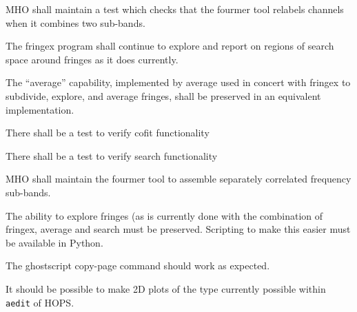 \begin{description}
 \acs{MHO} shall maintain a test which checks that the \acs{fourmer} 
tool relabels channels when it combines two sub-bands.
  
 The \acs{fringex} program shall continue to explore and report
      on regions of search space around fringes as it does currently.

 The ``average'' capability, implemented by \acs{average}
      used in concert with \acs{fringex} to subdivide, explore, and average
      fringes, shall be preserved in an equivalent implementation.
      
 There shall be a test to verify \acs{cofit} functionality
      
 There shall be a test to verify \acs{search} functionality
      
 \acs{MHO} shall maintain the \acs{fourmer} tool
      to assemble separately correlated frequency sub-bands.

 The ability to explore fringes (as is currently done with
    the combination of \acs{fringex}, \acs{average} and search must be
    preserved.  Scripting to make this easier must be available in
    \acs{Python}.

 The ghostscript copy-page command should work as expected.

 It should be possible to make 2D plots of the type
    currently possible within \texttt{\acs{aedit}} of \acs{HOPS}.
    

\end{description}
